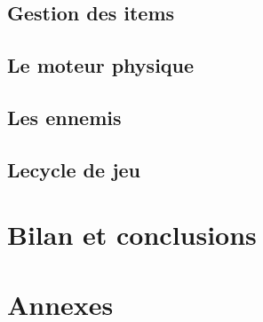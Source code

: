 \documentclass[a4paper,11pt]{article}
\begin{document}
\subsection{Gestion des items}
\subsection{Le moteur physique}
\subsection{Les ennemis}
\subsection{Lecycle de jeu}
\section{Bilan et conclusions}
\section{Annexes}
\end{document}
